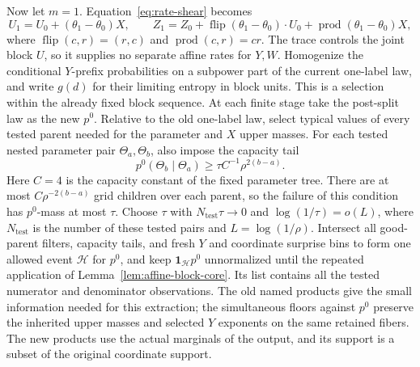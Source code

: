 Now let $m=1$. Equation~\eqref{eq:rate-shear} becomes
\begin{equation}\label{eq:rate-tied-shear}
 U_1=U_0+(\theta_1-\theta_0)X,\qquad
 Z_1=Z_0+\operatorname{flip}(\theta_1-\theta_0)\cdot U_0
                +\operatorname{prod}(\theta_1-\theta_0)X,
\end{equation}
where $\operatorname{flip}(c,r)=(r,c)$ and
$\operatorname{prod}(c,r)=cr$.
The trace controls the joint block $U$, so it supplies no separate
affine rates for $Y,W$.  Homogenize the conditional $Y$-prefix
probabilities on a subpower part of the current one-label law, and
write $g(d)$ for their limiting entropy in block units.  This is
a selection within the already fixed block sequence.  At each finite
stage take the post-split law as the new $p^0$.  Relative to the old
one-label law, select typical values of every tested parent needed
for the parameter and $X$ upper masses.  For each tested nested
parameter pair $\Theta_a,\Theta_b$, also impose the capacity tail
\[
 p^0(\Theta_b\mid\Theta_a)
       \ge\tau C^{-1}\rho^{2(b-a)}.
\]
Here $C=4$ is the capacity constant of the fixed parameter tree.
There are at most $C\rho^{-2(b-a)}$ grid children over each parent,
so the failure of this condition has $p^0$-mass at most $\tau$.
Choose $\tau$ with $N_{\mathrm{test}}\tau\to0$ and
$\log(1/\tau)=o(L)$, where $N_{\mathrm{test}}$ is the number of these
tested pairs and $L=\log(1/\rho)$.  Intersect all good-parent filters,
capacity tails, and fresh $Y$ and coordinate surprise bins to form
one allowed event $\mathcal H$ for $p^0$, and keep
$\boldsymbol1_{\mathcal H}p^0$ unnormalized until the repeated
application of Lemma~\ref{lem:affine-block-core}.  Its list contains
all the tested numerator and denominator observations.  The old
named products give the small information needed for this extraction;
the simultaneous floors against $p^0$ preserve the inherited upper
masses and selected $Y$ exponents on the same retained fibers.
The new products use the actual marginals of the output, and its
support is a subset of the original coordinate support.

